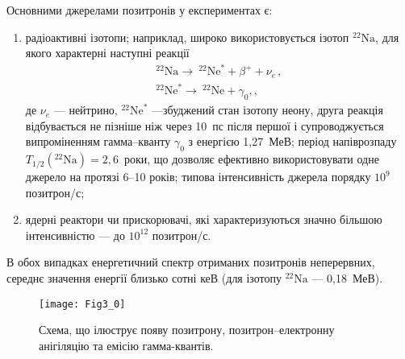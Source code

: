 Основними джерелами позитронів у експериментах є:
\begin{enumerate}[label=\asbuk*),leftmargin=0em,itemindent=1.5em]
  \item радіоактивні ізотопи;
  наприклад,  широко використовується ізотоп $^{22}\text{Na}$, для якого характерні наступні реакції
  \begin{gather*}
  ^{22}\text{Na}\rightarrow \:^{22}\text{Ne}^{*}+\beta^++\nu_e\,,\\
  ^{22}\text{Ne}^{*}\rightarrow \:^{22}\text{Ne}+\gamma_{0},,
  \end{gather*}
де
$\nu_e$ --- нейтрино,
$^{22}\text{Ne}^{*}$ ---збуджений стан ізотопу неону,
друга реакція відбувається не пізніше ніж через 10~пс після першої і супроводжується
випроміненням гамма--кванту $\gamma_0$ з енергією 1,27~МеВ;
період напіврозпаду $T_{1/2}(^{22}\text{Na})=2,6$~роки, що
дозволяє ефективно використовувати одне джерело на протязі 6--10 років;
 типова інтенсивність джерела порядку $10^9$ позитрон/с;
  \item ядерні реактори чи прискорювачі, які характеризуються значно більшою інтенсивністю --- до $10^{12}$ позитрон/с.
\end{enumerate}
В обох випадках енергетичний спектр отриманих позитронів неперервних,
середнє значення енергії близько сотні кеВ (для ізотопу $^{22}\text{Na}$ --- 0,18~МеВ).

\begin{figure}[t]
\center
\vspace{-5mm}
\texttt{[image: Fig3\_0]}
\vspace{-3mm}
\caption{Схема, що ілюструє появу позитрону, позитрон--електронну анігіляцію
та емісію гамма-квантів.}
\vspace{-3mm}
\label{F30}
\end{figure}


